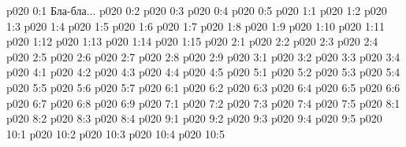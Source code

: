 \author{Совершенствователь Мудрости}
\vs p020 0:1  Бла-бла...
\vs p020 0:2 
\vs p020 0:3 
\vs p020 0:4 
\vs p020 0:5 \pc 
{}
\vs p020 1:1 
\vs p020 1:2 
\vs p020 1:3 
\vs p020 1:4 
\vs p020 1:5 \pc 
\vs p020 1:6 
\vs p020 1:7 
\vs p020 1:8 
\vs p020 1:9 
\vs p020 1:10 \pc 
\vs p020 1:11 \pc 
\vs p020 1:12 
\vs p020 1:13 
\vs p020 1:14 
\vs p020 1:15 
\vs p020 2:1 
\vs p020 2:2 
\vs p020 2:3 
\vs p020 2:4 \pc 
\vs p020 2:5 
\vs p020 2:6 
\vs p020 2:7 
\vs p020 2:8 \pc 
\vs p020 2:9 
\vs p020 3:1 
\vs p020 3:2 
\vs p020 3:3 
\vs p020 3:4 
\vs p020 4:1 
\vs p020 4:2 
\vs p020 4:3 
\vs p020 4:4 \pc 
\vs p020 4:5 
\vs p020 5:1 
\vs p020 5:2 
\vs p020 5:3 
\vs p020 5:4 
\vs p020 5:5 \pc 
\vs p020 5:6 
\vs p020 5:7 \pc 
{}
\vs p020 6:1 
\vs p020 6:2 \pc 
\vs p020 6:3 
\vs p020 6:4 
\vs p020 6:5 \pc 
\vs p020 6:6 \pc 
\vs p020 6:7 
\vs p020 6:8 
\vs p020 6:9 
\vs p020 7:1 
\vs p020 7:2 
\vs p020 7:3 
\vs p020 7:4 
\vs p020 7:5 
\vs p020 8:1 
\vs p020 8:2 
\vs p020 8:3 
\vs p020 8:4 
\vs p020 9:1 
\vs p020 9:2 
\vs p020 9:3 
\vs p020 9:4 
\vs p020 9:5 \pc 
{}
\vs p020 10:1 
\vs p020 10:2 
\vs p020 10:3 
\vs p020 10:4 
\vsetoff
\vs p020 10:5 
\quizlink
